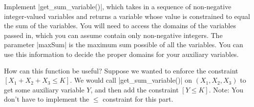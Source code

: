 \item {}
Implement |get_sum_variable()|, which
takes in a sequence of non-negative integer-valued variables and returns a
variable whose value is constrained to equal the sum of the variables. You will
need to access the domains of the variables passed in, which you can assume
contain only non-negative integers. The parameter |maxSum| is the maximum sum
possible of all the variables. You can use this information to decide the proper
domains for your auxiliary variables.

How can this function be useful? Suppose we wanted to enforce the constraint
$[X_1 + X_2 + X_3 \le K]$. We would call |get_sum_variable()| on $(X_1,X_2,X_3)$
to get some auxiliary variable $Y$, and then add the constraint $[Y \le K]$.
Note: You don't have to implement the $\le$ constraint for this part.
